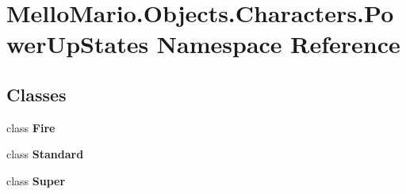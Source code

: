 \section{Mello\+Mario.\+Objects.\+Characters.\+Power\+Up\+States Namespace Reference}
\label{namespaceMelloMario_1_1Objects_1_1Characters_1_1PowerUpStates}
\subsection*{Classes}
\begin{DoxyCompactItemize}
\item 
class \textbf{ Fire}
\item 
class \textbf{ Standard}
\item 
class \textbf{ Super}
\end{DoxyCompactItemize}

